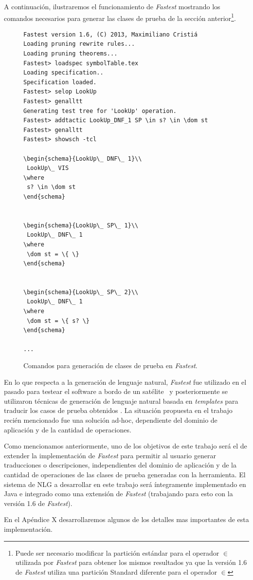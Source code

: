 A continuación, ilustraremos el funcionamiento de \emph{Fastest} mostrando los comandos necesarios para generar las clases de prueba de la sección anterior\footnote{Puede ser necesario modificar la partición estándar para el operador $\in$ utilizada por \emph{Fastest} para obtener los mismos resultados ya que la versión 1.6 de \emph{Fastest} utiliza una partición Standard diferente para el operador $\in$}.


\begin{figure}[H]
\begin{Verbatim}[frame=single,fontsize=\scriptsize]
Fastest version 1.6, (C) 2013, Maximiliano Cristiá
Loading pruning rewrite rules...
Loading pruning theorems...
Fastest> loadspec symbolTable.tex
Loading specification..
Specification loaded.
Fastest> selop LookUp
Fastest> genalltt 
Generating test tree for 'LookUp' operation.
Fastest> addtactic LookUp_DNF_1 SP \in s? \in \dom st
Fastest> genalltt                                    
Fastest> showsch -tcl

\begin{schema}{LookUp\_ DNF\_ 1}\\
 LookUp\_ VIS 
\where
 s? \in \dom st
\end{schema}


\begin{schema}{LookUp\_ SP\_ 1}\\
 LookUp\_ DNF\_ 1 
\where
 \dom st = \{ \}
\end{schema}


\begin{schema}{LookUp\_ SP\_ 2}\\
 LookUp\_ DNF\_ 1 
\where
 \dom st = \{ s? \}
\end{schema}

...
\end{Verbatim}
\caption{Comandos para generación de clases de prueba en \emph{Fastest}.}
\label{ej:comandos_fastest}
\end{figure}


En lo que respecta a la generación de lenguaje natural, \emph{Fastest} fue utilizado en el pasado para testear el software a bordo de un satélite~\cite{satelite} y posteriormente se utilizaron técnicas de generación de lenguaje natural basada en \textit{templates} para traducir los casos de prueba obtenidos \cite{cristia_pluss}. La situación propuesta en el trabajo recién mencionado fue una solución ad-hoc, dependiente del dominio de aplicación y de la cantidad de operaciones.


Como mencionamos anteriormente, uno de los objetivos de este trabajo será el de extender la implementación de \emph{Fastest} para permitir al usuario generar traducciones o descripciones, independientes del dominio de aplicación y de la cantidad de operaciones de las clases de prueba generadas con la herramienta.
El sistema de NLG a desarrollar en este trabajo será íntegramente implementado en Java e integrado como una extensión de \emph{Fastest} (trabajando para esto con la versión 1.6 de \emph{Fastest}).


En el Apéndice X desarrollaremos algunos de los detalles mas importantes de esta implementación.